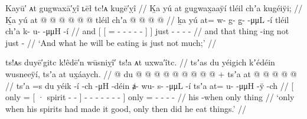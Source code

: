 \ex\label{ex:100-221-will-eat-not-much}%
%
\begingl
	\glpreamble	Kayū′ ᴀt gugwaxā′ỵî ʟēł tc!ᴀ kugē′ỵî //
	\glpreamble	Ḵa yú at gug̱wax̱aaÿí tléil chʼa kugéiÿi; //
	\gla	Ḵa {} yú {} at @  @ {} @ {} @ {} @ {} @ {} {} {}
		tléil chʼa  @ {} @ {} @ {} @ {} //
	\glb	ḵa {} yú {} at= w- g- g̱-  -μμL -í {} {}
		tléil chʼa k- u-  -μμH -í //
	\glc	and {}[ 
			{}[ = - - -  - - {}] {}]
		 just - -  - - //
	\gld	and {} that {} thing  {} {} {} {} -ing {} {}
		not just  {} {} {} {} - //
	\glft	‘And what he will be eating is just not much;’
		//
\endgl
\xe

\ex\label{ex:100-222-what-spirits-make-good}%
%
\begingl
	\glpreamble	ts!ᴀs duyē′gitc k!êdē′n wūsniỵî′ ts!a ᴀt uxwa′îtc. //
	\glpreamble	tsʼas du yéigich kʼédéin wusneeÿí, tsʼa at ux̱áaych. //
	\gla	{}  @ {}
			{} du  @ {} @ {} {}
			 @ {} @ {}
			 @ {} @ {} @ {} @ {} @ {} {} +
		tsʼa at @  @ {} @ {} @ {} @ {} //
	\glb	{} tsʼa =s
			{} du yéik -í -ch {}
			 -μH -déin
			ⱥ- wu- s-  -μμL -í {}
		tsʼa at= u-  -μμH -ÿ -ch //
	\glc	{}[ only =
			{}[ ·\xx{pss} spirit - - {}]
			 - -
			- - -  - - {}]
		only = -  - - - //
	\gld	{}  {}
			{} his  {} {} {}
			 {} {}
			 {} {} {} {} -when {}
		only thing  {} {} {} {} //
	\glft	‘only when his spirits had made it good, only then did he eat things.’
		//
\endgl
\xe


